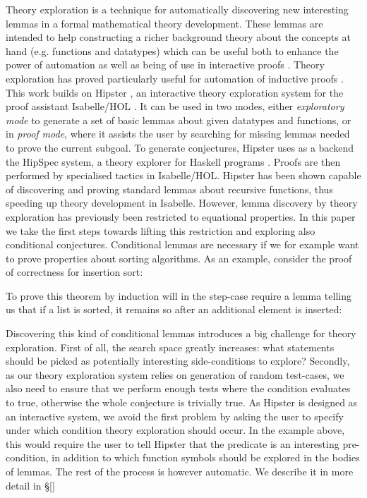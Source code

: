 \label{sec:intro}

Theory exploration is a technique for automatically discovering new interesting lemmas in a formal mathematical theory development.
%
These lemmas are intended to help constructing a richer background theory about the concepts at hand (e.g. functions and datatypes) which can be useful both to enhance the power of automation as well as being of use in interactive proofs \cite{mathsaid,isacosy,isascheme}.
%
Theory exploration has proved particularly useful for automation of inductive proofs \cite{hipspecCADE}. This work builds on Hipster \cite{hipster}, an interactive theory exploration system for the proof assistant Isabelle/HOL \cite{isabelle}.
%
It can be used in two modes, either \emph{exploratory mode} to generate a set of basic lemmas about given datatypes and functions, or in \emph{proof mode}, where it assists the user by searching for missing lemmas needed to prove the current subgoal.
%
To generate conjectures, Hipster uses as a backend the HipSpec system, a theory explorer for Haskell programs \cite{hipspecCADE}.
%
Proofs are then performed by specialised tactics in Isabelle/HOL. Hipster has been shown capable of discovering and proving standard lemmas about recursive functions, thus speeding up theory development in Isabelle.
%
However, lemma discovery by theory exploration has previously been restricted to equational properties.
%
In this paper we take the first steps towards lifting this restriction and exploring also conditional conjectures.
%
Conditional lemmas are necessary if we for example want to prove properties about sorting algorithms.
%
As an example, consider the proof of correctness for insertion sort:
%
\begin{center}
\end{center}
%
To prove this theorem by induction will in the step-case require a lemma telling us that if a list is sorted, it remains so after an additional element is inserted:
%
\begin{center}		
\end{center}
%
Discovering this kind of conditional lemmas introduces a big challenge for theory exploration.
%
First of all, the search space greatly increases: what statements should be picked as potentially interesting side-conditions to explore?
%
Secondly, as our theory exploration system relies on generation of random test-cases, we also need to ensure that we perform enough tests where the condition evaluates to true, otherwise the whole conjecture is trivially true.
%
As Hipster is designed as an interactive system, we avoid the first problem by asking the user to specify under which condition theory exploration should occur.
%
In the example above, this would require the user to tell Hipster that the predicate  is an interesting pre-condition, in addition to which function symbols should be explored in the bodies of lemmas.
%
The rest of the process is however automatic. We describe it in more detail in \S \ref{} 

